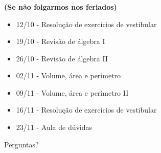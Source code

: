 \documentclass[handout]{beamer}
\begin{document}

\begin{frame}[fragile]\frametitle{\secname}
    \textbf{(Se não folgarmos nos feriados)}
    \begin{itemize}
        \item 12/10 - Resolução de exercícios de vestibular
        \item 19/10 - Revisão de álgebra I
        \item 26/10 - Revisão de álgebra II
        \item 02/11 - Volume, área e perímetro
        \item 09/11 - Volume, área e perímetro II 
        \item 16/11 - Resolução de exercícios de vestibular
        \item 23/11 - Aula de dúvidas
    \end{itemize}

\end{frame}



\begin{frame}
    \Huge{\centerline{Perguntas?}}
\end{frame}

\end{document}
